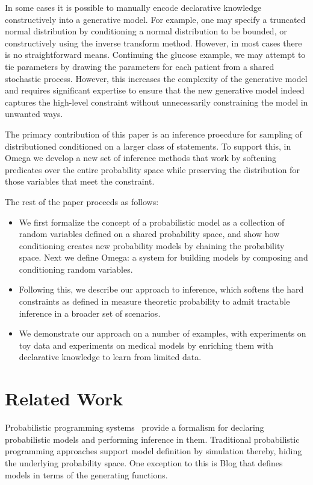 In some cases it is possible to manually encode declarative knowledge constructively into a generative model.
For example, one may specify a truncated normal distribution by conditioning a normal distribution to be bounded, or constructively using the inverse transform method.
However, in most cases there is no straightforward means.
Continuing the glucose example, we may attempt to tie parameters by drawing the parameters for each patient from a shared stochastic process.
However, this increases the complexity of the generative model and requires significant expertise to ensure that the new generative model indeed captures the high-level constraint without unnecessarily constraining the model in unwanted ways.

The primary contribution of this paper is an inference proecdure for sampling of distributioned conditioned on a larger class of statements.
To support this, in Omega we develop a new set of inference methods that work by softening predicates
over the entire probability space while preserving the distribution for those variables that meet the
constraint.

The rest of the paper proceeds as follows:
\begin{itemize}
\item We first formalize the concept of a probabilistic model as a collection of random variables defined on a shared probability space, and show how conditioning creates new probability models by chaining the probability space.  Next we define Omega: a system for building models by composing and conditioning random variables.
\item Following this, we describe our approach to inference, which softens the hard constraints as defined in measure theoretic probability to admit tractable inference in a broader set of scenarios.
\item  We demonstrate our approach on a number of examples, with experiments on toy data and experiments on medical models by enriching them with declarative knowledge to learn from limited data.
\end{itemize}

\section{Related Work}
Probabilistic programming systems~\citep{milch20071, wood2014new,mansinghka2014venture,goodman2008church,carpenter2017stan} provide a formalism
for declaring probabilistic models and performing inference
in them. Traditional probabilistic programming approaches support model definition by simulation thereby, hiding the underlying probability space. 
One exception to this is Blog \citep{milch20071} 
that defines models in terms of the generating functions.

